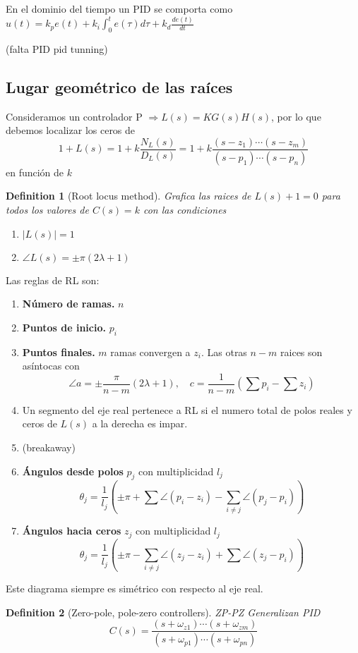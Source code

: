 \documentclass[leqno]{article}
\newtheorem*{definition}{Definition}
\begin{document}
En el dominio del tiempo un PID se comporta como $u(t) = k_pe(t)+k_i\int_0^te(\tau )d\tau + k_d \frac{de(t)}{dt}$

(falta PID pid tunning)

\subsection{Lugar geométrico de las raíces}
Consideramos un controlador P $\Rightarrow L(s) = KG(s)H(s)$, por lo que debemos localizar los ceros de 
\[
1+L(s) = 1+k \frac{N_L(s)}{D_L(s)} = 1 + k \frac{(s-z_1)\cdots (s-z_m)}{(s-p_1)\cdots(s-p_n)}
\] 
en función de $k$

\begin{definition}[Root locus method] Grafica las raices de $L(s)+1=0$ para todos los valores de  $C(s)=k$ con las condiciones
   \begin{enumerate}[topsep=-6pt, itemsep=0pt]
    \item $|L(s)|=1$ 
	\item  $\angle L(s) = \pm \pi(2\lambda+1)$
  \end{enumerate}
\end{definition}

Las reglas de RL son:
\begin{enumerate}[topsep=-6pt, itemsep=0pt]
  \item \textbf{Número de ramas.} $n$
  \item  \textbf{Puntos de inicio.} $p_i$
  \item  \textbf{Puntos finales.} $m$ ramas convergen a  $z_i$. Las otras  $n-m$ raices son asíntocas con
	 \[
	\angle a = \pm \frac{\pi}{n-m}(2\lambda+1), \quad c = \frac{1}{n-m} \left( \sum p_i - \sum z_i \right) 
	\] 
  \item Un segmento del eje real pertenece a RL si el numero total de polos reales y ceros de $L(s)$ a la derecha es impar.
  \item (breakaway)
  \item \textbf{Ángulos desde polos} $p_j$ con multiplicidad  $l_j$
	 \[
	\theta _j = \frac{1}{l_j} \left( \pm \pi + \sum \angle(p_i-z_i) - \sum_{i\neq j} \angle(p_j-p_i) \right) 
	\] 
  \item \textbf{Ángulos hacia ceros} $z_j$ con multiplicidad  $l_j$
	 \[
	\theta _j = \frac{1}{l_j} \left( \pm \pi - \sum_{i\neq j} \angle(z_j-z_i) + \sum \angle(z_j-p_i) \right) 
	\] 
\end{enumerate}
Este diagrama siempre es simétrico con respecto al eje real.

\begin{definition}[Zero-pole, pole-zero controllers] ZP-PZ Generalizan PID
  \[
  C(s) = \frac{(s+\omega _{z1})\cdots (s+\omega_{zm})}{(s+\omega _{p 1})\cdots(s+\omega _{pn})}
  \] 
\end{definition}
\end{document}
